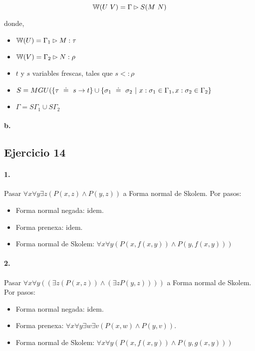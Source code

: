 \[\w{U\ V} = \Gamma \rhd S(M\ N)\]

donde,

\begin{itemize}
  \item $\mathbb{W}(U) = \Gamma_1 \rhd M : \tau$
  \item $\mathbb{W}(V) = \Gamma_2 \rhd N : \rho$
  \item $t$ y $s$ variables frescas, tales que $s <: \rho$
  \item $S = MGU(\{\tau \uni s\to t\} \cup \{\sigma_1 \uni \sigma_2 \vert x:\sigma_1 \in \Gamma_1, x:\sigma_2 \in \Gamma_2\}$
  \item $\Gamma = S\Gamma_1 \cup S\Gamma_2$
\end{itemize}


\paragraph{b.}


\subsection*{Ejercicio 14}

\paragraph{1.}

Pasar $\forall x\forall y\exists z (P(x,z)\land P(y,z))$ a Forma normal de Skolem. Por pasos:

\begin{itemize}
  \item Forma normal negada: idem.
  \item Forma prenexa: idem.
  \item Forma normal de Skolem: $\forall x\forall y (P(x,f(x,y))\land P(y,f(x,y)))$
\end{itemize}

\paragraph{2.}

Pasar $\forall x\forall y((\exists z (P(x,z))\land (\exists z P(y,z))))$ a Forma normal de Skolem. Por pasos:

\begin{itemize}
  \item Forma normal negada: idem.
  \item Forma prenexa: $\forall x\forall y\exists w\exists v (P(x,w)\land P(y,v))$.
  \item Forma normal de Skolem: $\forall x\forall y (P(x,f(x,y))\land P(y,g(x,y)))$
\end{itemize}

